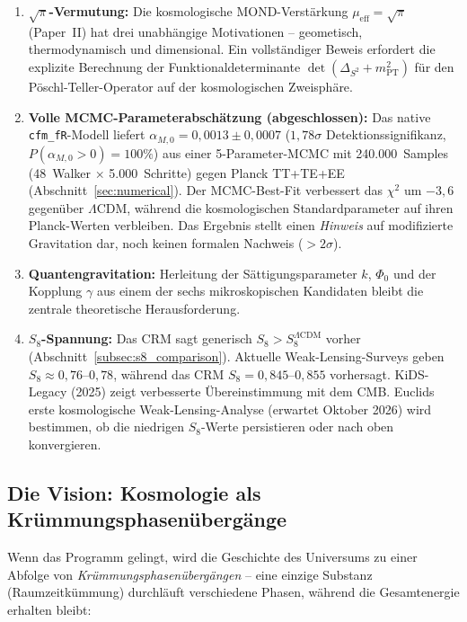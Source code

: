 \documentclass[11pt,a4paper]{article}
\begin{document}
\begin{enumerate}
\item \textbf{$\sqrt{\pi}$-Vermutung:} Die kosmologische MOND-Verst\"arkung $\mu_{\mathrm{eff}} = \sqrt{\pi}$ (Paper~II) hat drei unabh\"angige Motivationen -- geometisch, thermodynamisch und dimensional. Ein vollst\"andiger Beweis erfordert die explizite Berechnung der Funktionaldeterminante $\det(\Delta_{S^2} + m_{\mathrm{PT}}^2)$ f\"ur den P\"oschl-Teller-Operator auf der kosmologischen Zweisph\"are.

\item \textbf{Volle MCMC-Parameterabsch\"atzung (abgeschlossen):} Das native \texttt{cfm\_fR}-Modell liefert $\alpha_{M,0} = 0{,}0013 \pm 0{,}0007$ ($1{,}78\sigma$ Detektionssignifikanz, $P(\alpha_{M,0} > 0) = 100\%$) aus einer 5-Parameter-MCMC mit 240.000~Samples (48~Walker $\times$ 5.000~Schritte) gegen Planck TT+TE+EE (Abschnitt~\ref{sec:numerical}). Der MCMC-Best-Fit verbessert das $\chi^2$ um $-3{,}6$ gegen\"uber $\Lambda$CDM, w\"ahrend die kosmologischen Standardparameter auf ihren Planck-Werten verbleiben. Das Ergebnis stellt einen \textit{Hinweis} auf modifizierte Gravitation dar, noch keinen formalen Nachweis ($> 2\sigma$).

\item \textbf{Quantengravitation:} Herleitung der S\"attigungsparameter $k$, $\Phi_0$ und der Kopplung $\gamma$ aus einem der sechs mikroskopischen Kandidaten bleibt die zentrale theoretische Herausforderung.

\item \textbf{$S_8$-Spannung:} Das CRM sagt generisch $S_8 > S_8^{\Lambda\mathrm{CDM}}$ vorher (Abschnitt~\ref{subsec:s8_comparison}). Aktuelle Weak-Lensing-Surveys geben $S_8 \approx 0{,}76$--$0{,}78$, w\"ahrend das CRM $S_8 = 0{,}845$--$0{,}855$ vorhersagt. KiDS-Legacy (2025) zeigt verbesserte \"Ubereinstimmung mit dem CMB. Euclids erste kosmologische Weak-Lensing-Analyse (erwartet Oktober 2026) wird bestimmen, ob die niedrigen $S_8$-Werte persistieren oder nach oben konvergieren.
\end{enumerate}

\subsection{Die Vision: Kosmologie als Kr\"ummungsphasen\"uberg\"ange}

Wenn das Programm gelingt, wird die Geschichte des Universums zu einer Abfolge von \textit{Kr\"ummungsphasen\"uberg\"angen} -- eine einzige Substanz (Raumzeitk\"ummung) durchl\"auft verschiedene Phasen, w\"ahrend die Gesamtenergie erhalten bleibt:
\end{document}
